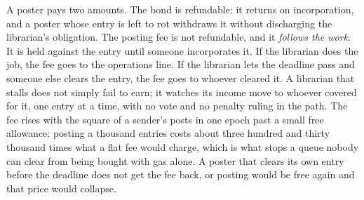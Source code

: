 \documentclass[11pt]{article}
\begin{document}
\begin{itemize}
          A poster pays two amounts. The bond is refundable: it returns on
          incorporation, and a poster whose entry is left to rot withdraws it
          without discharging the librarian's obligation. The posting fee is
          not refundable, and it \emph{follows the work}. It is held against
          the entry until someone incorporates it. If the librarian does the
          job, the fee goes to the operations line. If the librarian lets the
          deadline pass and someone else clears the entry, the fee goes to
          whoever cleared it. A librarian that stalls does not simply fail to
          earn; it watches its income move to whoever covered for it, one
          entry at a time, with no vote and no penalty ruling in the path.
          The fee rises with the square of a sender's posts in one epoch past
          a small free allowance: posting a thousand entries costs about
          three hundred and thirty thousand times what a flat fee would
          charge, which is
          what stops a queue nobody can clear from being bought with gas
          alone. A poster that clears its own entry before the deadline does
          not get the fee back, or posting would be free again and that price
          would collapse.


\end{itemize}
\end{document}
